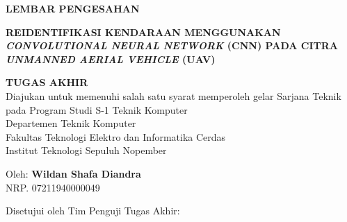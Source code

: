 \begin{center}
  \large
  \textbf{LEMBAR PENGESAHAN}
\end{center}

\vspace{4mm}


\begin{center}
  \textbf{
    REIDENTIFIKASI KENDARAAN MENGGUNAKAN \emph{CONVOLUTIONAL NEURAL NETWORK} (CNN)
    PADA CITRA \emph{UNMANNED AERIAL VEHICLE} (UAV)
  }
\end{center}

\begingroup
\small

\begin{center}
  \textbf{TUGAS AKHIR} \\
  Diajukan untuk memenuhi salah satu syarat memperoleh gelar
  Sarjana Teknik pada
  Program Studi S-1 Teknik Komputer \\
  Departemen Teknik Komputer \\
  Fakultas Teknologi Elektro dan Informatika Cerdas \\
  Institut Teknologi Sepuluh Nopember
\end{center}

\begin{center}
  Oleh: \textbf{Wildan Shafa Diandra} \\
  NRP. 07211940000049
\end{center}

\begin{center}
  Disetujui oleh Tim Penguji Tugas Akhir:
\end{center}

\begingroup
\setlength{\tabcolsep}{0pt}

